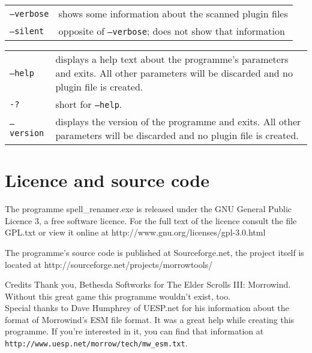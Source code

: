 \documentclass[12pt,oneside,a4paper]{article}
\begin{document}
\newline
\begin{tabular}{p{7cm} p{8cm}}
\texttt{--verbose}                & shows some information about the scanned plugin files\\
\texttt{--silent}                 & opposite of \texttt{--verbose}; does not show that information\\
\end{tabular}
\newline
\begin{tabular}{p{7cm} p{8cm}}
\texttt{--help}                   & displays a help text about the programme's parameters and exits. All other parameters will be discarded and no plugin file is created.\\
\texttt{-?}                       & short for \texttt{--help}.\\
\texttt{--version}                & displays the version of the programme and exits. All other parameters will be discarded and no plugin file is created.\\
\end{tabular}

\section{Licence and source code}
The programme spell\_renamer.exe is released under the GNU General Public Licence 3,
a free software licence. For the full text of the licence consult the file GPL.txt
or view it online at http://www.gnu.org/licenses\slash gpl-3.0.html

The programme's source code is published at Sourceforge.net, the project itself
is located at http://sourceforge.net/projects/morrowtools/

\begin{section}{Credits}
Thank you, Bethesda Softworks for The Elder Scrolls III: Morrowind.
Without this great game this programme wouldn't exist, too.\\
Special thanks to Dave Humphrey of UESP.net for his information about the format
of Morrowind's ESM file format. It was a great help while creating this programme.
If you're interested in it, you can find that information at  \texttt{http://www.uesp.net\slash morrow\slash tech/mw\_esm.txt}.
\end{section}
\end{document}
